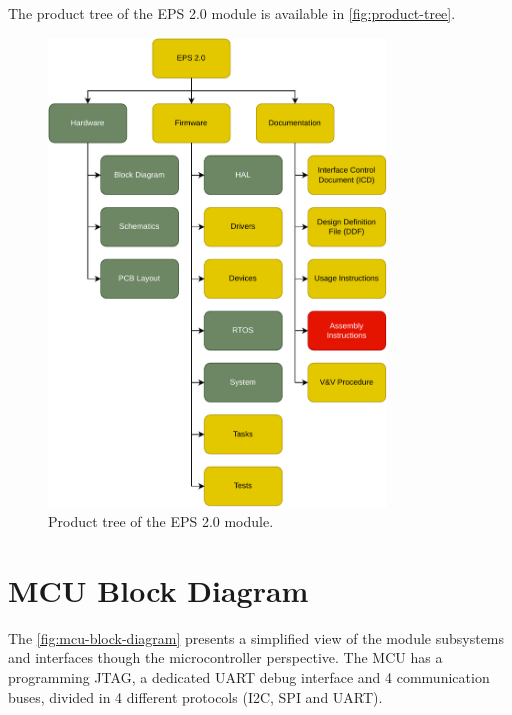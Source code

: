 The product tree of the EPS 2.0 module is available in \autoref{fig:product-tree}.

\begin{figure}[!ht]
    \begin{center}
        \includegraphics[width=0.8\textwidth]{figures/product-tree.pdf}
        \caption{Product tree of the EPS 2.0 module.}
        \label{fig:product-tree}
    \end{center}
\end{figure}

\section{MCU Block Diagram}

The \autoref{fig:mcu-block-diagram} presents a simplified view of the module subsystems and interfaces though the microcontroller perspective. 
The MCU has a programming JTAG, a dedicated UART debug interface and 4 communication buses, divided in 4 different protocols (I2C, SPI and UART). 

